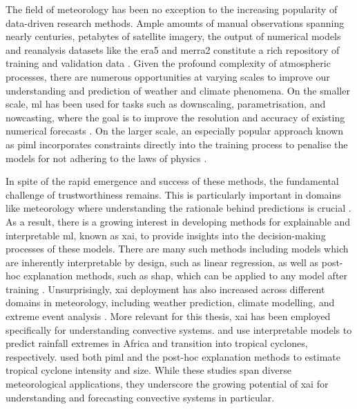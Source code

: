 The field of meteorology has been no exception to the increasing popularity of data-driven research methods. Ample amounts of manual observations spanning nearly centuries, petabytes of satellite imagery, the output of numerical models and reanalysis datasets like the \acrfull{era5} and \acrfull{merra2} constitute a rich repository of training and validation data \citep{Bracco2024,Waqas2024,Zhang2025}. Given the profound complexity of atmospheric processes, there are numerous opportunities at varying scales to improve our understanding and prediction of weather and climate phenomena. On the smaller scale, \acrshort{ml} has been used for tasks such as downscaling, parametrisation, and nowcasting, where the goal is to improve the resolution and accuracy of existing numerical forecasts \citep{Blunn2024,Zhang2023}. On the larger scale, an especially popular approach known as \acrfull{piml} incorporates constraints directly into the training process to penalise the models for not adhering to the laws of physics \citep{Pathak2022,Luo2025,Zhang2023}.

In spite of the rapid emergence and success of these methods, the fundamental challenge of trustworthiness remains. This is particularly important in domains like meteorology where understanding the rationale behind predictions is crucial \citep{BarredoArrieta2019,Zhang2025}. As a result, there is a growing interest in developing methods for explainable and interpretable \acrshort{ml}, known as \acrfull{xai}, to provide insights into the decision-making processes of these models. There are many such methods including models which are inherently interpretable by design, such as linear regression, as well as post-hoc explanation methods, such as \acrfull{shap}, which can be applied to any model after training \citep{BarredoArrieta2019,Molnar2025}. Unsurprisingly, \acrshort{xai} deployment has also increased across different domains in meteorology, including weather prediction, climate modelling, and extreme event analysis \citep{Mamalakis2022,Yang2024}. More relevant for this thesis, \acrshort{xai} has been employed specifically for understanding convective systems. \cite{Bassine2025} and \cite{Zhang2019} use interpretable models to predict rainfall extremes in Africa and  transition into tropical cyclones, respectively. \cite{Zhuo2021} used both \acrshort{piml} and the post-hoc explanation methods to estimate tropical cyclone intensity and size. While these studies span diverse meteorological applications, they underscore the growing potential of \acrshort{xai} for understanding and forecasting convective systems in particular.

